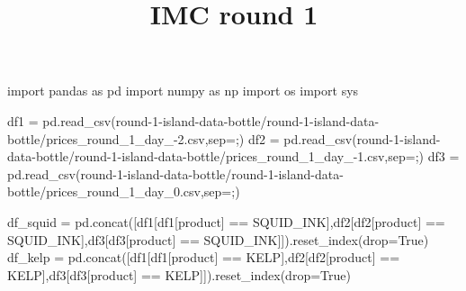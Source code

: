 \documentclass[
  letterpaper,
  DIV=11,
  numbers=noendperiod]{scrartcl}
\title{IMC round 1}
\author{}
\date{}
\newenvironment{Shaded}{\begin{snugshade}}{\end{snugshade}}
\newcommand{\ImportTok}[1]{\textcolor[rgb]{0.00,0.46,0.62}{#1}}
\newcommand{\NormalTok}[1]{\textcolor[rgb]{0.00,0.23,0.31}{#1}}
\newcommand{\OperatorTok}[1]{\textcolor[rgb]{0.37,0.37,0.37}{#1}}
\newcommand{\StringTok}[1]{\textcolor[rgb]{0.13,0.47,0.30}{#1}}
\newcommand{\VariableTok}[1]{\textcolor[rgb]{0.07,0.07,0.07}{#1}}
\begin{document}
\maketitle


\begin{Shaded}
\begin{Highlighting}[]
\ImportTok{import}\NormalTok{ pandas }\ImportTok{as}\NormalTok{ pd}
\ImportTok{import}\NormalTok{ numpy }\ImportTok{as}\NormalTok{ np}
\ImportTok{import}\NormalTok{ os}
\ImportTok{import}\NormalTok{ sys}
\end{Highlighting}
\end{Shaded}

\begin{Shaded}
\begin{Highlighting}[]
\NormalTok{df1 }\OperatorTok{=}\NormalTok{ pd.read\_csv(}\StringTok{\textquotesingle{}round{-}1{-}island{-}data{-}bottle/round{-}1{-}island{-}data{-}bottle/prices\_round\_1\_day\_{-}2.csv\textquotesingle{}}\NormalTok{,sep}\OperatorTok{=}\StringTok{\textquotesingle{};\textquotesingle{}}\NormalTok{)}
\NormalTok{df2 }\OperatorTok{=}\NormalTok{ pd.read\_csv(}\StringTok{\textquotesingle{}round{-}1{-}island{-}data{-}bottle/round{-}1{-}island{-}data{-}bottle/prices\_round\_1\_day\_{-}1.csv\textquotesingle{}}\NormalTok{,sep}\OperatorTok{=}\StringTok{\textquotesingle{};\textquotesingle{}}\NormalTok{)}
\NormalTok{df3 }\OperatorTok{=}\NormalTok{ pd.read\_csv(}\StringTok{\textquotesingle{}round{-}1{-}island{-}data{-}bottle/round{-}1{-}island{-}data{-}bottle/prices\_round\_1\_day\_0.csv\textquotesingle{}}\NormalTok{,sep}\OperatorTok{=}\StringTok{\textquotesingle{};\textquotesingle{}}\NormalTok{)}
\end{Highlighting}
\end{Shaded}

\begin{Shaded}
\begin{Highlighting}[]
\NormalTok{df\_squid }\OperatorTok{=}\NormalTok{ pd.concat([df1[df1[}\StringTok{\textquotesingle{}product\textquotesingle{}}\NormalTok{] }\OperatorTok{==} \StringTok{\textquotesingle{}SQUID\_INK\textquotesingle{}}\NormalTok{],df2[df2[}\StringTok{\textquotesingle{}product\textquotesingle{}}\NormalTok{] }\OperatorTok{==} \StringTok{\textquotesingle{}SQUID\_INK\textquotesingle{}}\NormalTok{],df3[df3[}\StringTok{\textquotesingle{}product\textquotesingle{}}\NormalTok{] }\OperatorTok{==} \StringTok{\textquotesingle{}SQUID\_INK\textquotesingle{}}\NormalTok{]]).reset\_index(drop}\OperatorTok{=}\VariableTok{True}\NormalTok{)}
\NormalTok{df\_kelp }\OperatorTok{=}\NormalTok{ pd.concat([df1[df1[}\StringTok{\textquotesingle{}product\textquotesingle{}}\NormalTok{] }\OperatorTok{==} \StringTok{\textquotesingle{}KELP\textquotesingle{}}\NormalTok{],df2[df2[}\StringTok{\textquotesingle{}product\textquotesingle{}}\NormalTok{] }\OperatorTok{==} \StringTok{\textquotesingle{}KELP\textquotesingle{}}\NormalTok{],df3[df3[}\StringTok{\textquotesingle{}product\textquotesingle{}}\NormalTok{] }\OperatorTok{==} \StringTok{\textquotesingle{}KELP\textquotesingle{}}\NormalTok{]]).reset\_index(drop}\OperatorTok{=}\VariableTok{True}\NormalTok{)}
\end{Highlighting}
\end{Shaded}
\end{document}
